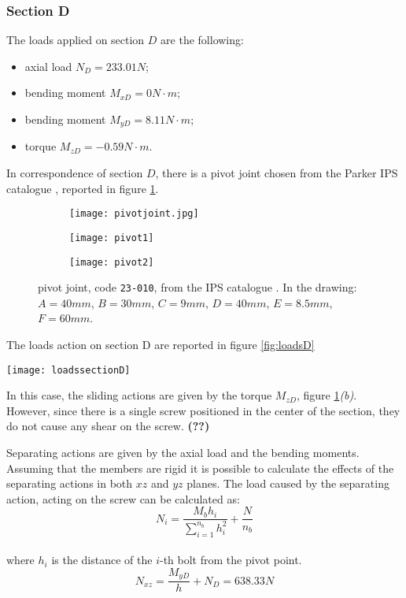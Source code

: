 \subsubsection*{Section D}
The loads applied on section $D$ are the following:
\begin{itemize}
	\item axial load $N_{D} = 233.01 N$;
	\item bending moment $M_{xD} = 0 N\cdot m$; 
	\item bending moment $M_{yD} = 8.11 N\cdot m$; 
	\item torque $M_{zD} = -0.59 N\cdot m$.
\end{itemize}
In correspondence of section $D$, there is a pivot joint chosen from the Parker IPS catalogue \cite{parker-ds}, reported in figure \ref{fig:pivot}.
\begin{figure}[h!]
    \centering
    \begin{subfigure}{0.32\linewidth}
    	\centering \texttt{[image: pivotjoint.jpg]}
    \end{subfigure}
	\begin{subfigure}{0.32\linewidth}
		\centering \texttt{[image: pivot1]} 
	\end{subfigure}
	\begin{subfigure}{0.32\linewidth}
		\centering \texttt{[image: pivot2]}
	\end{subfigure}    
    \caption{pivot joint, code \texttt{23-010}, from the IPS catalogue \cite{parker-ds}. In the drawing: $A = 40mm$, $B=30mm$, $C=9mm$, $D=40mm$, $E=8.5mm$, $F=60mm$.}
    \label{fig:pivot}
\end{figure}
The loads action on section D are reported in figure \ref{fig:loadsD}
\begin{SCfigure}[1.5][h!]
	\centering
	\texttt{[image: loadssectionD]}
	\caption{loads acting on section D}
	\label{fig:loadsD}
\end{SCfigure}

In this case, the sliding actions are given by the torque $M_{zD}$,  figure \ref{fig:pivot}\textit{(b)}. However, since there is a single screw positioned in the center of the section, they do not cause any shear on the screw. \textbf{(??)}

Separating actions are given by the axial load and the bending moments. Assuming that the members are rigid it is possible to calculate the effects of the separating actions in both $xz$ and $yz$ planes. The load caused by the separating action, acting on the screw can be calculated as:
\begin{equation*}
    N_{i} = \frac{M_{b}h_{i}}{\sum\limits_{i=1}^{n_{b}} h^2_{i}} + \frac{N}{n_{b}}
\end{equation*}\\
where $h_{i}$ is the distance of the $i$-th bolt from the pivot point.
\begin{equation*}
    N_{xz} = \frac{M_{yD}}{h} + N_{D} = 638.33 N
\end{equation*}

